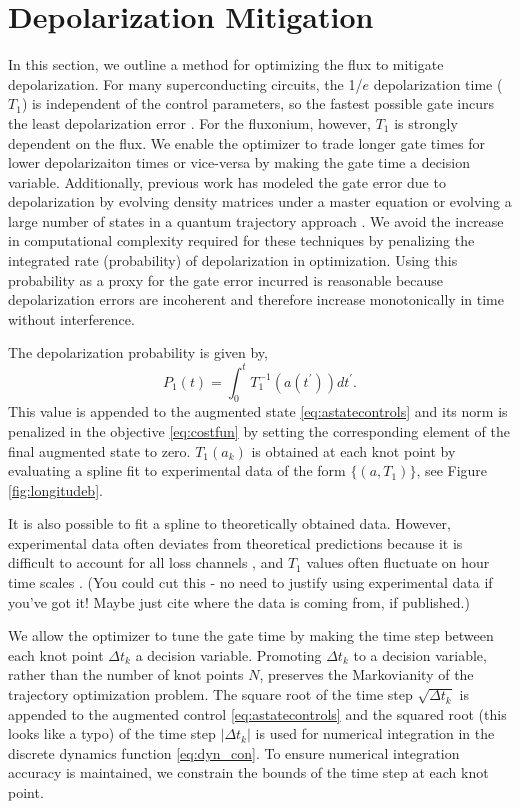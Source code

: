 \section{Depolarization Mitigation\label{sec:longitude}}
In this section, we outline a method
for optimizing the flux to mitigate depolarization.
For many superconducting circuits, the 1/$e$ depolarization time ($T_{1}$) is independent of the control parameters,
so the fastest possible gate incurs the least depolarization error
\cite{schulteherbruggen2011optimal}.
For the fluxonium, however, $T_{1}$ is strongly dependent on the flux.
We enable the optimizer to trade longer gate times
for lower depolarizaiton times or vice-versa by making the gate time a decision variable.
Additionally, previous work has modeled the gate error due to depolarization
by evolving density matrices under a master
equation \cite{rembold2020introduction, schulteherbruggen2011optimal}
or evolving a large number of states in a quantum trajectory approach
\cite{abdelhafez2019gradient}.
We avoid the increase in computational complexity required for these
techniques by penalizing the integrated rate (probability) of depolarization in optimization.
Using this probability as a proxy for the gate error incurred
is reasonable because depolarization errors are incoherent and therefore
increase monotonically in time without interference.

The depolarization probability is given by,
\begin{equation}
  P_{1}(t) = \int_{0}^{t} T_{1}^{-1}(a(t^{\prime})) dt^{\prime}.
\end{equation}
This value is appended to the augmented state \eqref{eq:astatecontrols}
and its norm is penalized in the objective \eqref{eq:costfun} by setting
the corresponding element of the final augmented state to zero.
$T_{1}(a_{k})$ is obtained at each knot point by evaluating
a spline fit to experimental data of the form $\{(a, T_{1})\}$,
see Figure \ref{fig:longitudeb}.

It is also possible to fit a spline to theoretically obtained data.
However, experimental data often deviates from theoretical predictions
because it is difficult to account for all loss channels \cite{zhang2020universal},
and $T_{1}$ values often fluctuate on hour
time scales \cite{klimov2018fluctuations}. (You could cut this - no need to justify using experimental data if you've got it! Maybe just cite where the data is coming from, if published.)

We allow the optimizer to tune the gate time by
making the time step between each knot point $\Delta t_{k}$
a decision variable. Promoting $\Delta t_{k}$ to a decision variable, rather
than the number of knot points $N$, preserves the
Markovianity of the trajectory
optimization problem. The square root of the time step $\sqrt{\Delta t_{k}}$
is appended to the augmented control \eqref{eq:astatecontrols}
and the squared root (this looks like a typo)
of the time step $\lvert \Delta t_{k} \rvert$ is used
for numerical integration in the discrete dynamics function \eqref{eq:dyn_con}.
To ensure numerical
integration accuracy is maintained, we constrain
the bounds of the time step at each knot point.

